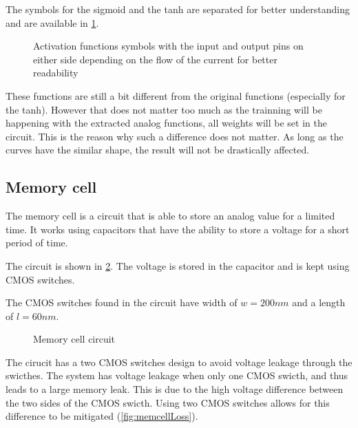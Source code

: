 The symbols for the sigmoid and the \ac{tanh} are separated for better understanding and are available in \cref{sym:af}.

\begin{figure}[b]
  \centering
  \hspace*{0.8cm}
  \hfill
  \hspace*{0.8cm}
  \caption{Activation functions symbols with the input and output pins on either side depending on the flow of the current for better readability}
  \label{sym:af}
\end{figure}

These functions are still a bit different from the original functions (especially for the \ac{tanh}). However that does not matter too much as the trainning will be happening with the extracted analog functions, all weights will be set in the circuit. This is the reason why such a difference does not matter. As long as the curves have the similar shape, the result will not be drastically affected.

\subsection{Memory cell}

The memory cell is a circuit that is able to store an analog value for a limited time. It works using capacitors that have the ability to store a voltage for a short period of time.

The circuit is shown in \cref{circt:memcell}. The voltage is stored in the capacitor and is kept using \ac{CMOS} switches.

The \ac{CMOS} switches found in the circuit have width of $w=200nm$ and a length of $l=60nm$.

\begin{figure}[t]
  \centering
  
  \caption{Memory cell circuit}
  \label{circt:memcell}
\end{figure}

The cirucit has a two \ac{CMOS} switches design to avoid voltage leakage through the swicthes. The system has voltage leakage when only one \ac{CMOS} swicth, and thus leads to a large memory leak. This is due to the high voltage difference between the two sides of the \ac{CMOS} swicth. Using two \ac{CMOS} switches allows for this difference to be mitigated (\cref{fig:memcellLoss}).

